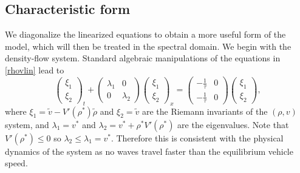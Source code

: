 \documentclass[preprint]{elsarticle}
\begin{document}
\subsection{Characteristic form}
We diagonalize the linearized equations to obtain a more useful form of the model, which will then be treated in the spectral domain. 
We begin with the density-flow system. Standard algebraic manipulations of the equations in \eqref{rhovlin} lead to
\begin{equation}
\begin{pmatrix}
\xi_1 \\ \xi_2
\end{pmatrix}_t
+ \begin{pmatrix}
\lambda_1 & 0 \\
0 & \lambda_2 
\end{pmatrix}
\begin{pmatrix}
\xi_1 \\ \xi_2
\end{pmatrix}_x
= \begin{pmatrix}
-\frac{1}{\tau} & 0 \\
-\frac{1}{\tau} & 0
\end{pmatrix}
\begin{pmatrix}
\xi_1 \\ \xi_2
\end{pmatrix},
\end{equation}
where $\xi_1 = \tilde{v} - V'( \rho^* )\tilde{\rho}$ and $\xi_2 = \tilde{v}$ are the Riemann invariants of the $(\rho, v)$ system, and $\lambda_1 = v^*$ and $\lambda_2 = v^* + \rho^* V'( \rho^*)$ are the eigenvalues. Note that $V'( \rho^*) \leq 0$ so $\lambda_2 \leq \lambda_1 = v^*$. Therefore this is consistent with the physical dynamics of the system as no waves travel faster than the equilibrium vehicle speed. 
\end{document}
